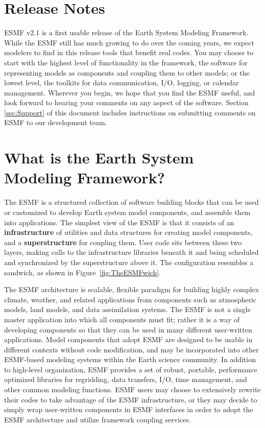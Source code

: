 
\section{Release Notes}

ESMF v2.1 is a first usable release of the Earth System 
Modeling Framework.  While the ESMF still has much growing to do
over the coming years, we expect modelers to find in this release 
tools that benefit real codes.  You may choose to start with the
highest level of functionality in the framework, the software
for representing models as components and coupling them to other
models; or the lowest level, the toolkits for data communication,
I/O, logging, or calendar management.  Wherever you begin, we hope
that you find the ESMF useful, and look forward to hearing your
comments on any aspect of the software.
Section \ref{sec:Support} 
of this document includes instructions on submitting comments on 
ESMF to our development team.

\section{What is the Earth System Modeling Framework?}

The ESMF is a structured collection of software building blocks that 
can be used or customized to develop 
Earth system model components, and assemble them into applications.  
The simplest view of the ESMF is that it consists of an
{\bf infrastructure} of utilities and data structures for creating 
model components, and a {\bf superstructure} for coupling them.  
User code sits between these two layers, making calls to the infrastructure
libraries beneath it and being scheduled and synchronized by the 
superstructure above it.  The configuration resembles a sandwich, as
shown in Figure~\ref{fig:TheESMFwich}.

The ESMF architecture is scalable, flexible paradigm for building highly 
complex climate, weather, and related applications from components such
as atmospheric models, land models, and data assimilation systems.  The 
ESMF is not a single master application into which all components must fit; 
rather it is a way of developing components so that they can be used 
in many different user-written applications.  Model components that adopt 
ESMF are designed to be usable in different contexts without code 
modification, and may be
incorporated into other ESMF-based modeling systems within the Earth 
science community.  In addition to high-level organization, ESMF provides 
a set of robust, portable, performance optimized libraries for regridding, 
data transfers, I/O, time management, and other common modeling functions.  
ESMF users may choose to extensively rewrite their codes to take advantage 
of the ESMF infrastructure, or they may decide to simply wrap user-written 
components in ESMF interfaces in order to adopt the ESMF architecture and 
utilize framework coupling services.

